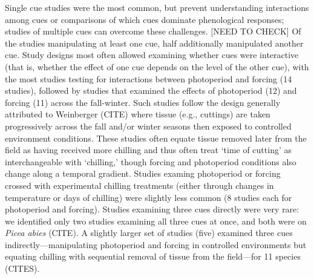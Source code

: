 \documentclass[11pt,letter]{article}
\begin{document}
Single cue studies were the most common, but prevent understanding interactions among cues or comparisons of which cues dominate phenological responses; studies of multiple cues can overcome these challenges. [NEED TO CHECK] Of the studies manipulating at least one cue, half additionally manipulated another cue. Study designs most often allowed examining whether cues were interactive (that is, whether the effect of one cue depends on the level of the other cue), with the most studies testing for interactions between photoperiod and forcing (14 studies), followed by studies that examined the effects of photoperiod (12) and forcing (11) across the fall-winter. Such studies follow the design generally attributed to Weinberger (CITE) where tissue (e.g., cuttings) are taken progressively across the fall and/or winter seasons then exposed to controlled environment conditions. These studies often equate tissue removed later from the field as having received more chilling and thus often treat `time of cutting' as interchangeable with `chilling,' though forcing and photoperiod conditions also change along a temporal gradient. Studies examing photoperiod or forcing crossed with experimental chilling treatments (either through changes in temperature or days of chilling) were slightly less common (8 studies each for photoperiod and forcing). Studies examining three cues directly were very rare: we identified only two studies examining all three cues at once, and both were on \emph{Picea abies} (CITE). A slightly larger set of studies (five) examined three cues indirectly---manipulating photoperiod and forcing in controlled environments but equating chilling with sequential removal of tissue from the field---for 11 species (CITES). \\
\end{document}
